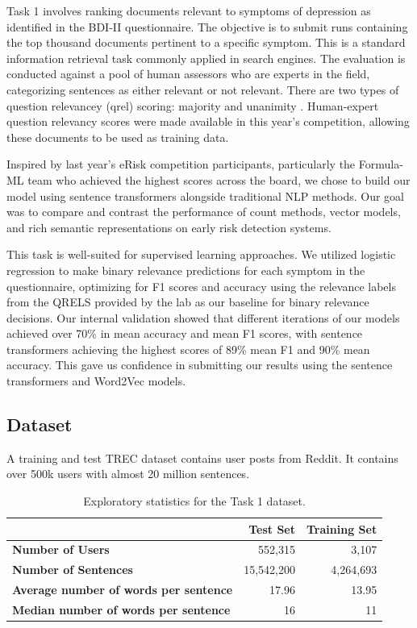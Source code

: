 \documentclass[]{style/ceurart}
\begin{document}
Task 1 involves ranking documents relevant to symptoms of depression as identified in the BDI-II questionnaire.
The objective is to submit runs containing the top thousand documents pertinent to a specific symptom.
This is a standard information retrieval task commonly applied in search engines.
The evaluation is conducted against a pool of human assessors who are experts in the field, categorizing sentences as either relevant or not relevant.
There are two types of question relevancey (qrel) scoring: majority and unanimity \cite{noauthor_text_nodate}.
Human-expert question relevancy scores were made available in this year's competition, allowing these documents to be used as training data.

Inspired by last year's eRisk competition participants, particularly the Formula-ML team who achieved the highest scores across the board, we chose to build our model using sentence transformers alongside traditional NLP methods. Our goal was to compare and contrast the performance of count methods, vector models, and rich semantic representations on early risk detection systems.

This task is well-suited for supervised learning approaches. We utilized logistic regression to make binary relevance predictions for each symptom in the questionnaire, optimizing for F1 scores and accuracy using the relevance labels from the QRELS provided by the lab as our baseline for binary relevance decisions. Our internal validation showed that different iterations of our models achieved over 70\% in mean accuracy and mean F1 scores, with sentence transformers achieving the highest scores of 89\% mean F1 and 90\% mean accuracy. This gave us confidence in submitting our results using the sentence transformers and Word2Vec models.


\subsection{Dataset}

A training and test TREC dataset contains user posts from Reddit.
It contains over 500k users with almost 20 million sentences.


\begin{table}[h]
  \caption{Exploratory statistics for the Task 1 dataset.}
  \label{tab:task1-stats}
  \centering
  \begin{tabular}{lrr}
      \toprule
       & \textbf{Test Set} & \textbf{Training Set} \\
      \midrule
      \textbf{Number of Users} & 552,315 & 3,107 \\
      \textbf{Number of Sentences} & 15,542,200 & 4,264,693 \\
      \textbf{Average number of words per sentence} & 17.96 & 13.95 \\
      \textbf{Median number of words per sentence} & 16 & 11 \\
      \bottomrule
  \end{tabular}
\end{table}
\end{document}
